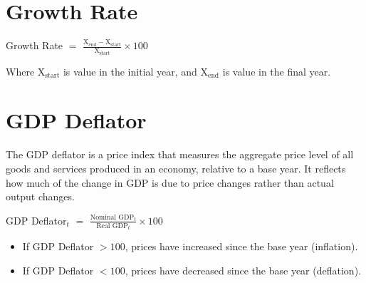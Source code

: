 \documentclass[a4paper, 11pt]{article}
\begin{document}
\section{Growth Rate}
\begin{center}
    Growth Rate $=$ $\frac{\text{X}_\text{end}-\text{X}_\text{start}}{\text{X}_\text{start}} \times 100$
\end{center}
Where $\text{X}_\text{start}$ is value in the initial year, and $\text{X}_\text{end}$ is value in the final year.

\section{GDP Deflator}
The GDP deflator is a price index that measures the aggregate price level of all goods and services produced in an economy, relative to a base year. It reflects how much of the change in GDP is due to price changes rather than actual output changes.
\begin{center}
    GDP Deflator$_t$ $=$ $\frac{\text{Nominal GDP}_t}{\text{Real GDP}_t} \times 100$
\end{center}
\begin{itemize}
    \item If GDP Deflator $>100$, prices have increased since the base year (inflation).
    \item If GDP Deflator $<100$, prices have decreased since the base year (deflation).
\end{itemize}
\end{document}
